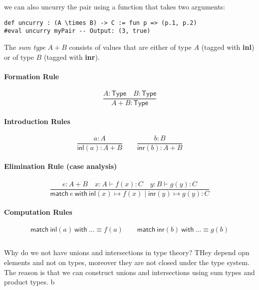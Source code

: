 we can also uncurry the pair using a function that takes two arguments:
\begin{lstlisting}[language=Lean]
def uncurry : (A \times B) -> C := fun p => (p.1, p.2)
#eval uncurry myPair -- Output: (3, true)
\end{lstlisting}


The \emph{sum type} $A + B$ consists of values that are either of type $A$ (tagged with \textbf{inl}) or of type $B$ (tagged with \textbf{inr}).

\paragraph{Formation Rule}
\[
  \frac{A : \mathsf{Type} \quad B : \mathsf{Type}}{A + B : \mathsf{Type}}
\]

\paragraph{Introduction Rules}
\[
  \frac{a : A}{\mathsf{inl}(a) : A + B}
  \qquad
  \frac{b : B}{\mathsf{inr}(b) : A + B}
\]

\paragraph{Elimination Rule (case analysis)}
\[
  \frac{ 
    e : A + B
    \quad
    x : A \vdash f(x) : C
    \quad
    y : B \vdash g(y) : C
  }{
    \mathsf{match}\ e\ \mathsf{with} \ \mathsf{inl}(x) \mapsto f(x) \mid \mathsf{inr}(y) \mapsto g(y) : C
  }
\]

\paragraph{Computation Rules}
\[
  \mathsf{match}\ \mathsf{inl}(a) \ \mathsf{with} \ \dots \equiv f(a)
  \qquad
  \mathsf{match}\ \mathsf{inr}(b) \ \mathsf{with} \ \dots \equiv g(b)
\]

\begin{example}
    \begin{lstlisting}[language=Lean]

\end{lstlisting}
\end{example}

Why do we not have unions and intersections in type theory?
THey depend opn elements and not on types, moreover they are not closed under the type system.
The reason is that we can construct unions and intersections using sum types and product types.
b

